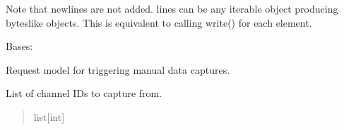 \documentclass[letterpaper,10pt,english]{sphinxmanual}
\begin{document}
\begin{fulllineitems}
\begin{fulllineitems}
\sphinxAtStartPar
Note that newlines are not added.  lines can be any iterable object
producing bytes\sphinxhyphen{}like objects. This is equivalent to calling write() for
each element.

\end{fulllineitems}


\end{fulllineitems}


\begin{fulllineitems}
\label{\detokenize{modules/src.pig_sorting_api.main:src.pig_sorting_api.main.CaptureRequest}}
\pysigstartsignatures
\pysiglinewithargsret
{}
{\sphinxparamcomma {}}
{}
\pysigstopsignatures
\sphinxAtStartPar
Bases: 

\sphinxAtStartPar
Request model for triggering manual data captures.

\begin{fulllineitems}
\label{\detokenize{modules/src.pig_sorting_api.main:src.pig_sorting_api.main.CaptureRequest.channels}}
\pysigstartsignatures
\pysigline
{}
\pysigstopsignatures
\sphinxAtStartPar
List of channel IDs to capture from.
\begin{quote}\begin{description}
\sphinxAtStartPar
list{[}int{]}

\end{description}\end{quote}

\end{fulllineitems}



\end{fulllineitems}
\end{document}
